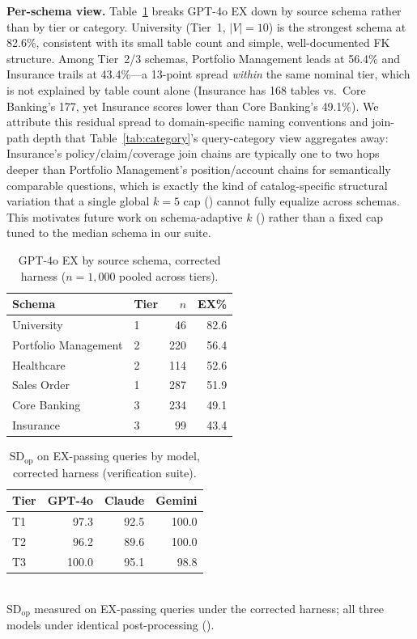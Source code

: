 \documentclass[twocolumn]{svjour3}
\begin{document}
\textbf{Per-schema view.}
Table~\ref{tab:byschema} breaks GPT-4o EX down by source schema rather than by tier or category.
University (Tier~1, $|V|{=}10$) is the strongest schema at 82.6\%, consistent with its small table count and simple, well-documented FK structure.
Among Tier~2/3 schemas, Portfolio Management leads at 56.4\% and Insurance trails at 43.4\%---a 13-point spread \emph{within} the same nominal tier, which is not explained by table count alone (Insurance has 168 tables vs.\ Core Banking's 177, yet Insurance scores lower than Core Banking's 49.1\%).
We attribute this residual spread to domain-specific naming conventions and join-path depth that Table~\ref{tab:category}'s query-category view aggregates away: Insurance's policy/claim/coverage join chains are typically one to two hops deeper than Portfolio Management's position/account chains for semantically comparable questions, which is exactly the kind of catalog-specific structural variation that a single global $k{=}5$ cap () cannot fully equalize across schemas.
This motivates future work on schema-adaptive $k$ () rather than a fixed cap tuned to the median schema in our suite.

\begin{table}[t]
\centering
\caption{GPT-4o EX by source schema, corrected harness ($n{=}1{,}000$ pooled across tiers).}
\label{tab:byschema}
\small
\begin{tabular}{@{}llrr@{}}
\toprule
\textbf{Schema} & \textbf{Tier} & \textbf{$n$} & \textbf{EX\%} \\
\midrule
University & 1 & 46 & 82.6 \\
Portfolio Management & 2 & 220 & 56.4 \\
Healthcare & 2 & 114 & 52.6 \\
Sales Order & 1 & 287 & 51.9 \\
Core Banking & 3 & 234 & 49.1 \\
Insurance & 3 & 99 & 43.4 \\
\bottomrule
\end{tabular}
\end{table}

\begin{table}[t]
\centering
\caption{$\text{SD}_{\text{op}}$ on EX-passing queries by model, corrected harness (verification suite).}
\label{tab:sdop}
\small
\begin{tabular}{@{}lrrr@{}}
\toprule
\textbf{Tier} & \textbf{GPT-4o} & \textbf{Claude} & \textbf{Gemini} \\
\midrule
T1 & 97.3 & 92.5 & 100.0 \\
T2 & 96.2 & 89.6 & 100.0 \\
T3 & 100.0 & 95.1 & 98.8 \\
\bottomrule
\end{tabular}\\
{\scriptsize SD$_{\text{op}}$ measured on EX-passing queries under the corrected harness; all three models under identical post-processing ().}
\end{table}
\end{document}
